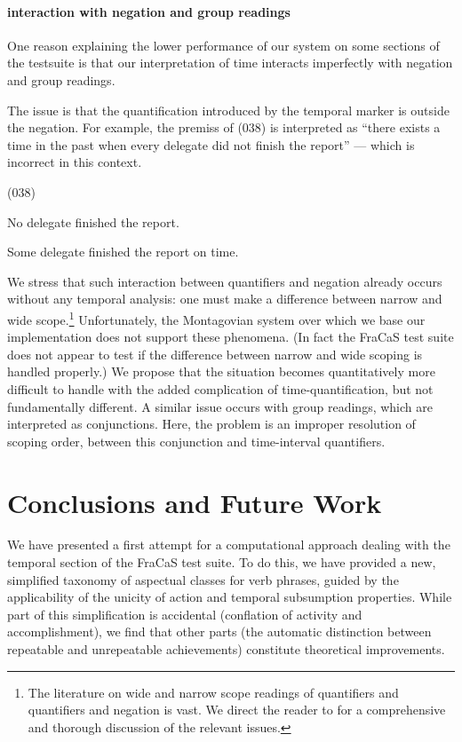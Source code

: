 \documentclass[a4paper,11pt]{article}
\newcommand\hyp{\item[H]}
\newcommand\fracasex[2]{\begin{lingex}\item[(#1)] \begin{subex} #2 \end{subex} \end{lingex} }
\begin{document}
\paragraph{interaction with negation and group readings}
One reason explaining the lower performance of our system on some
sections of the testsuite is that our interpretation of time interacts
imperfectly with negation and group readings.

The issue is that the quantification introduced by the temporal marker
is outside the negation. For example, the premiss of (038) is
interpreted as ``there exists a time in the past when every delegate
did not finish the report'' --- which is incorrect in this context.
\fracasex{038}{
\item	No delegate finished the report.
\hyp 	Some delegate finished the report on time.
}
%
We stress that such interaction between quantifiers and negation
already occurs without any temporal analysis: one must make a difference
between narrow  and wide scope.\footnote{The literature on wide and narrow scope readings of quantifiers and quantifiers and negation is vast. We direct the reader to \cite{steedman:2012} for a comprehensive and thorough discussion of the relevant issues.} Unfortunately,
the Montagovian system over which we base our implementation does not
support these phenomena. (In fact the FraCaS test suite does not appear to
test if the difference between narrow and wide scoping is handled properly.)
We propose that the situation becomes
quantitatively more difficult to handle with the added complication of
time-quantification, but not fundamentally different.
%
A similar issue occurs with group readings, which are interpreted as
conjunctions. Here, the problem is an improper resolution of scoping
order, between this conjunction and time-interval quantifiers.

\section{Conclusions and Future Work}
\label{sec:conclusion}

We have presented a first attempt for a computational approach dealing
with the temporal section of the FraCaS test suite. To do this, we
have provided a new, simplified taxonomy of aspectual classes for verb
phrases, guided by the applicability of the unicity of action and
temporal subsumption properties. While part of this simplification is
accidental (conflation of activity and accomplishment), we find that
other parts (the automatic distinction between repeatable and
unrepeatable achievements) constitute theoretical improvements.
\end{document}
